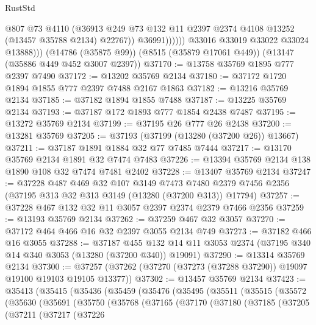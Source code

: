\begin{lexlean}{RustStd}
\begin{coremodule}
                        @807
                        @73
                        @4110
                        (@36913
                          @249
                          @73
                          @132
                          @11
                          @2397
                          @2374
                          @4108
                          @13252
                          (@13457 @35788 @2134)
                          @22767))
                      @36991))))))
          @33016
          @33019
          @33022
          @33024
          @13888)))
    (@14786 (@35875 @99))
    (@8515 (@35879 @17061 @449))
    (@13147 (@35886 @449 @452 @3007 @2397))
@37170 := @13758 @35769 @1895 @777 @2397 @7490
@37172 := @13202 @35769 @2134
@37180 := @37172 @1720 @1894 @1855 @777 @2397 @7488 @2167 @1863
@37182 := @13216 @35769 @2134
@37185 := @37182 @1894 @1855 @7488
@37187 := @13225 @35769 @2134
@37193 := @37187 @172 @1893 @777 @1854 @2438 @7487
@37195 := @13272 @35769 @2134
@37199 := @37195 @26 @777 @26 @2438
@37200 := @13281 @35769
@37205 := @37193 (@37199 (@13280 (@37200 @26)) @13667)
@37211 := @37187 @1891 @1884 @32 @77 @7485 @7444
@37217 := @13170 @35769 @2134 @1891 @32 @7474 @7483
@37226 := @13394 @35769 @2134 @138 @1890 @108 @32 @7474 @7481 @2402
@37228 := @13407 @35769 @2134
@37247 := @37228
    @487
    @469
    @32
    @107
    @3149
    @7473
    @7480
    @2379
    @7456
    @2356
    (@37195 @313 @32 @313 @3149 (@13280 (@37200 @313)) @17794)
@37257 := @37228 @467 @132 @32 @11 @3057 @2397 @2374 @2379 @7466 @2356
@37259 := @13193 @35769 @2134
@37262 := @37259 @467 @32 @3057
@37270 := @37172 @464 @466 @16 @32 @2397 @3055 @2134 @749
@37273 := @37182 @466 @16 @3055
@37288 := @37187
    @455
    @132
    @14
    @11
    @3053
    @2374
    (@37195 @340 @14 @340 @3053 (@13280 (@37200 @340)) @19091)
@37290 := @13314 @35769 @2134
@37300 := @37257 (@37262 (@37270 (@37273 (@37288 @37290)) @19097 @19100 @19103 @19105 @13377))
@37302 := @13457 @35769 @2134
@37423 := @35413
    (@35415
      (@35436
        (@35459
          (@35476
            (@35495
              (@35511
                (@35515
                  (@35572
                    (@35630
                      (@35691
                        (@35750
                          (@35768
                            (@37165
                              (@37170
                                (@37180
                                  (@37185
                                    (@37205
                                      (@37211
                                        (@37217
                                          (@37226

\end{coremodule}
\end{lexlean}
